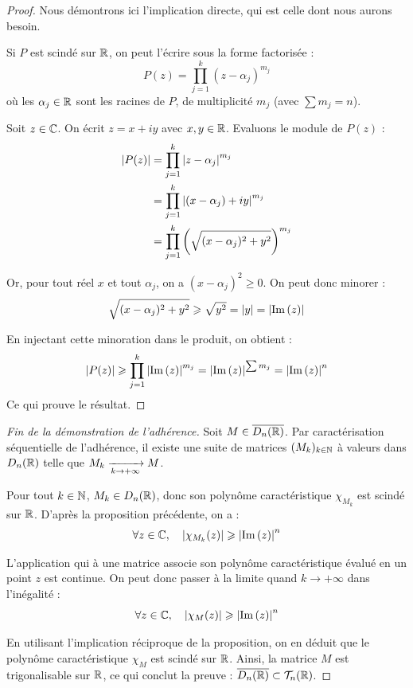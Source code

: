 \begin{proof}
    Nous démontrons ici l'implication directe, qui est celle dont nous aurons besoin.
    
    Si $P$ est scindé sur $\mathbb{R}$, on peut l'écrire sous la forme factorisée :
    \[ P(z) = \prod_{j=1}^k (z - \alpha_j)^{m_j} \]
    où les $\alpha_j \in \mathbb{R}$ sont les racines de $P$, de multiplicité $m_j$ (avec $\sum m_j = n$).
    
    Soit $z \in \mathbb{C}$. On écrit $z = x + iy$ avec $x, y \in \mathbb{R}$. Evaluons le module de $P(z)$ :
    \begin{align*}
        \left|P(z)\right| &= \prod_{j=1}^k \left|z - \alpha_j\right|^{m_j} \\
                   &= \prod_{j=1}^k \left|(x - \alpha_j) + iy\right|^{m_j} \\
                   &= \prod_{j=1}^k \left( \sqrt{(x - \alpha_j)^2 + y^2} \right)^{m_j}
    \end{align*}
    
    Or, pour tout réel $x$ et tout $\alpha_j$, on a $(x - \alpha_j)^2 \geqslant 0$. On peut donc minorer :
    \[ \sqrt{(x - \alpha_j)^2 + y^2} \geqslant \sqrt{y^2} = \left|y\right| = \left|\operatorname{Im} \,(z)\right| \]
    
    En injectant cette minoration dans le produit, on obtient :
    \[ \left|P(z)\right| \geqslant \prod_{j=1}^k \left|\operatorname{Im} \,(z)\right|^{m_j} = \left|\operatorname{Im} \,(z)\right|^{\sum m_j} = \left|\operatorname{Im} \,(z)\right|^n \]
    Ce qui prouve le résultat.
\end{proof}

\begin{proof}[Fin de la démonstration de l'adhérence]
    Soit $M \in \overline{D_n(\mathbb{R})}$. Par caractérisation séquentielle de l'adhérence, il existe une suite de matrices $(M_k)_{k \in \mathbb{N}}$ à valeurs dans $D_n(\mathbb{R})$ telle que $M_k \xrightarrow[k \to +\infty]{} M$.
    
    Pour tout $k \in \mathbb{N}$, $M_k \in D_n(\mathbb{R})$, donc son polynôme caractéristique $\chi_{M_k}$ est scindé sur $\mathbb{R}$. D'après la proposition précédente, on a :
    \[ \forall z \in \mathbb{C}, \quad \left|\chi_{M_k}(z)\right| \geqslant \left|\operatorname{Im} \,(z)\right|^n \]
    
    L'application qui à une matrice associe son polynôme caractéristique évalué en un point $z$ est continue. On peut donc passer à la limite quand $k \to +\infty$ dans l'inégalité :
    \[ \forall z \in \mathbb{C}, \quad \left|\chi_M(z)\right| \geqslant \left|\operatorname{Im} \,(z)\right|^n \]
    
    En utilisant l'implication réciproque de la proposition, on en déduit que le polynôme caractéristique $\chi_M$ est scindé sur $\mathbb{R}$.
    Ainsi, la matrice $M$ est trigonalisable sur $\mathbb{R}$, ce qui conclut la preuve : $\overline{D_n(\mathbb{R})} \subset \mathcal{T}_n(\mathbb{R})$.
\end{proof}

